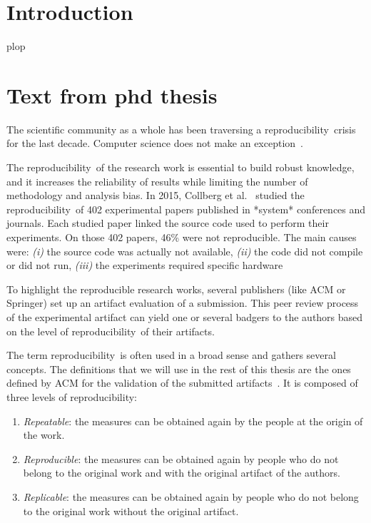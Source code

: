 \documentclass[sigconf,natbib=false]{acmart}
\newcommand{\repro}{reproducibility}
\begin{document}

\section{Introduction}

plop \cite{Abril07}



\section{Text from phd thesis}

The scientific community as a whole has been traversing a \repro\ crisis for the last decade.
Computer science does not make an exception\ \cite{randallIrreproducibilityCrisisModern2018,baker500ScientistsLift2016}.

The \repro\ of the research work is essential to build robust knowledge, and it increases the reliability of results while limiting the number of methodology and analysis bias.
In 2015, Collberg et al.\ \cite{collberg_repeatability_2015} studied the \repro\ of 402 experimental papers published in *system* conferences and journals.
Each studied paper linked the source code used to perform their experiments. 
On those 402 papers, 46\% were not reproducible.
The main causes were:
\emph{(i)} the source code was actually not available,
\emph{(ii)} the code did not compile or did not run,
\emph{(iii)} the experiments required specific hardware

To highlight the reproducible research works, several publishers (like ACM or Springer) set up an artifact evaluation of a submission.
This peer review process of the experimental artifact can yield one or several badgers to the authors based on the level of \repro\ of their artifacts.

The term \repro\ is often used in a broad sense and gathers several concepts.
The definitions that we will use in the rest of this thesis are the ones defined by ACM for the validation of the submitted artifacts\ \cite{acm-badges}.
It is composed of three levels of \repro:

\begin{enumerate}
\item \emph{Repeatable}: the measures can be obtained again by the people at the origin of the work.
\item \emph{Reproducible}: the measures can be obtained again by people who do not belong to the original work and with the original artifact of the authors.
\item \emph{Replicable}: the measures can be obtained again by people who do not belong to the original work without the original artifact.
\end{enumerate}
\end{document}
